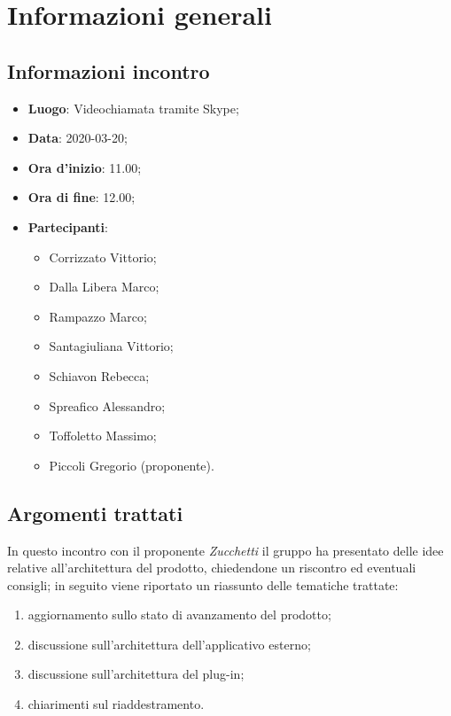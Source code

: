 \section{Informazioni generali}
    \subsection{Informazioni incontro}
        \begin{itemize}
            \item \textbf{Luogo}: Videochiamata tramite Skype;
            \item \textbf{Data}: 2020-03-20;
            \item \textbf{Ora d'inizio}: 11.00;
            \item \textbf{Ora di fine}: 12.00;
            \item \textbf{Partecipanti}: 
            \begin{itemize}
            	\item Corrizzato Vittorio;
                \item Dalla Libera Marco;
                \item Rampazzo Marco;
                \item Santagiuliana Vittorio;
                \item Schiavon Rebecca;
                \item Spreafico Alessandro;
                \item Toffoletto Massimo;
                \item Piccoli Gregorio (proponente).
            \end{itemize}
        \end{itemize}
    \subsection{Argomenti trattati}
        In questo incontro con il proponente \textit{Zucchetti} il gruppo ha presentato delle idee relative all'architettura del prodotto\glo, chiedendone un riscontro ed eventuali consigli; in seguito viene riportato un riassunto delle tematiche trattate:
        \begin{enumerate}
            \item aggiornamento sullo stato di avanzamento del prodotto\glo;
            \item discussione sull'architettura dell'applicativo esterno;
            \item discussione sull'architettura del plug-in;
            \item chiarimenti sul riaddestramento.
        \end{enumerate}

